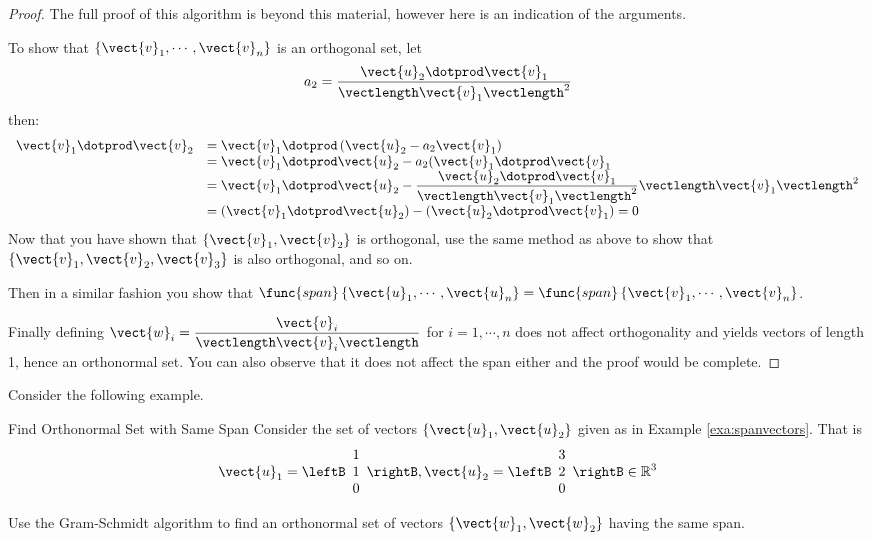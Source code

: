\begin{proof}
The full proof of this algorithm is beyond this material, however here is an indication of the arguments. 

To show that  $\left\{ \vect{v}_1,\cdots , \vect{v}_n  \right\} $ is an orthogonal set, let 
\[ a_2 =  \dfrac{ \vect{u}_2 \dotprod \vect{v}_1}{\vectlength \vect{v}_1 \vectlength^2} \]
then: 
\[
\begin{array}{ll}
 \vect{v}_1 \dotprod \vect{v}_2 &  =  \vect{v}_1 \dotprod \left( \vect{u}_2 - a_2 \vect{v}_1 \right)  \\
 & = \vect{v}_1 \dotprod \vect{u}_2 - a_2 (\vect{v}_1 \dotprod \vect{v}_1  \\
 & = \vect{v}_1 \dotprod \vect{u}_2 - \dfrac{ \vect{u}_2 \dotprod \vect{v}_1}{\vectlength \vect{v}_1 \vectlength^2} \vectlength \vect{v}_1 \vectlength^2 \\
 & = ( \vect{v}_1 \dotprod \vect{u}_2 ) - ( \vect{u}_2 \dotprod \vect{v}_1 ) =0\\
\end{array}
\]
Now that you have shown that $\{ \vect{v}_1, \vect{v}_2\}$ is orthogonal,  use the same method as above to show that 
$\{ \vect{v}_1, \vect{v}_2, \vect{v}_3\}$ is also orthogonal,  and so on. 

Then in a similar fashion you show that $\func{span}\left\{
\vect{u}_1,\cdots ,\vect{u}_n \right\} = \func{span}\left\{
\vect{v}_1,\cdots ,\vect{v}_n \right\}$.

Finally defining $\vect{w}_i =
\dfrac{\vect{v}_i}{\vectlength\vect{v}_i\vectlength}$ for $i=1, \cdots
,n$ does not affect orthogonality and yields vectors of length 1,
hence an orthonormal set. You can also observe that it does not affect
the span either and the proof would be complete.
\end{proof}

Consider the following example.

\begin{example}{Find Orthonormal Set with Same Span}\label{exa:orthosamespan}
Consider the set of vectors $\{\vect{u}_1, \vect{u}_2\}$ given as in Example \ref{exa:spanvectors}. That is  
\[
\vect{u}_1=\leftB 
\begin{array}{r}
1 \\
1 \\
0
\end{array}
\rightB, \vect{u}_2=\leftB 
\begin{array}{r}
3 \\
2 \\
0
\end{array}
\rightB \in \mathbb{R}^{3} 
\]

Use the Gram-Schmidt algorithm to find an orthonormal set of vectors $\{\vect{w}_1, \vect{w}_2\}$ having the same span.
\end{example}

